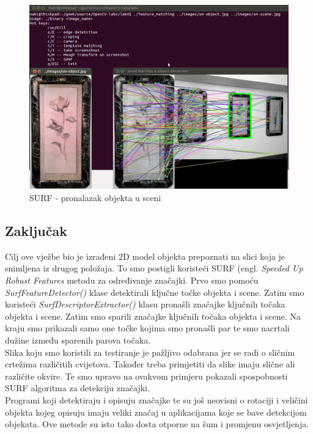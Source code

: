 \begin{figure}[h]
\centering
\includegraphics[scale=0.42]{images/lab4-surf-01.png}
\caption{SURF - pronalazak objekta u sceni}
\label{fig:lab4-surf-01}
\end{figure}

\newpage
\subsection{Zaključak}
Cilj ove vježbe bio je izrađeni 2D model objekta prepoznati na 
slici koja je snimljena iz drugog položaja.
To smo postigli koristeći SURF (engl. \textit{Speeded Up Robust
Features} metodu za određivanje značajki. Prvo smo pomoću
\textit{SurfFeatureDetector()} klase detektirali ključne točke
objekta i scene. Zatim smo koristeći \textit{SurfDescriptorExtractor()}
klasu pronašli značajke ključnih točaka objekta i scene. Zatim smo
sparili značajke ključnih točaka objekta i scene. Na kraju smo prikazali
samo one točke kojima smo pronašli par te smo nacrtali dužine između
sparenih parova točaka.
\\
Slika koju smo koristili za testiranje je pažljivo odabrana jer se radi
o sličnim crtežima različitih cvijetova. Također treba primjetiti
da slike imaju slične ali različite okvire. Te smo upravo na ovakvom
primjeru pokazali spospobnosti SURF algoritma za detekciju značajki.
\\
Programi koji detektiraju i opisuju značajke te su još neovisni o
rotaciji i veličini objekta kojeg opisuju imaju veliki značaj u
aplikacijama koje se bave detekcijom objekata. Ove metode su isto tako
dosta otporne na šum i promjenu osvjetljenja. 

